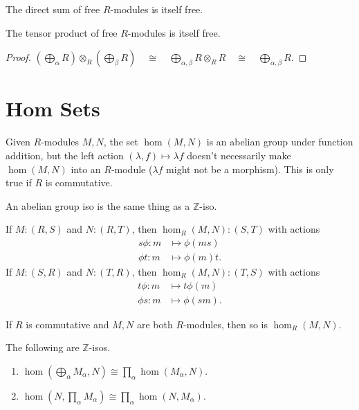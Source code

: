 \documentclass[twoside,10pt]{report}
\begin{document}
\begin{cor}
	The direct sum of free $R$-modules is itself free.
\end{cor}

\begin{prop}
	The tensor product of free $R$-modules is itself free.
\end{prop}
\begin{proof}
	$(\bigoplus_{\alpha}R) \otimes_{R} (\bigoplus_{\beta}R) \quad\cong \quad \bigoplus_{\alpha,\beta}R \otimes_{R}R \quad\cong \quad \bigoplus_{\alpha,\beta}R$.
\end{proof}


\section{Hom Sets}

Given $R$-modules $M,N$, the set $\hom(M,N)$ is an abelian group under function addition, but the left action $(\lambda, f) \mapsto \lambda f$ doesn't necessarily make $\hom(M,N)$ into an $R$-module ($\lambda f$ might not be a morphism). This is only true if $R$ is commutative.

\begin{note}[]
An abelian group iso is the same thing as a $\mathbb{Z}$-iso.
\end{note}

\begin{prop}
	If $M:(R,S)$ and $N:(R,T)$, then $\hom_R(M,N):(S,T)$ with actions
	\begin{align*}
		s\phi : m &\mapsto \phi(ms)\\
		\phi t : m &\mapsto \phi(m)t.
	\end{align*}
	If $M:(S,R)$ and $N:(T,R)$, then $\hom_R(M,N):(T,S)$ with actions
	\begin{align*}
		t\phi : m &\mapsto t\phi(m)\\
		\phi s : m &\mapsto \phi(sm).
        \end{align*}
\end{prop}

\begin{cor}
	If $R$ is commutative and $M,N$ are both $R$-modules, then so is $\hom_R(M,N)$.
\end{cor}

\begin{thrm}[]
	The following are $\mathbb{Z}$-isos.
\begin{enumerate}
	\item $\hom\left(\bigoplus_{\alpha}M_{\alpha}, N\right) \cong \prod_{\alpha}\hom\left( M_{\alpha},N \right)$.
	\item $\hom\left( N, \prod_{\alpha}M_{\alpha} \right) \cong \prod_{\alpha}\hom(N, M_{\alpha})$.
\end{enumerate}
\end{thrm}
\end{document}

